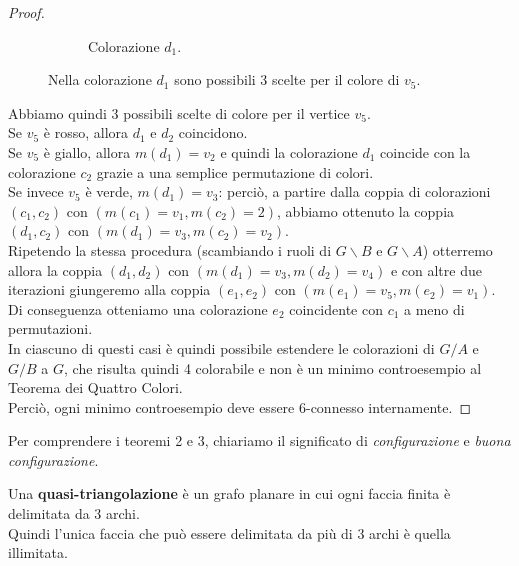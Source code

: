 \documentclass[a4paper,12pt,titlepage]{report}
\begin{document}
\begin{proof}
\begin{figure}[H]
\begin{subfigure}{0.3\textwidth}
    			\caption{Colorazione $d_1$.}
    		\end{subfigure}
    		\vspace{0.5cm}
    		\caption{Nella colorazione $d_1$ sono possibili 3 scelte per il colore di $v_5$.}
    	\end{figure}
    	\noindent Abbiamo quindi 3 possibili scelte di colore per il vertice $v_5$.
    	\\Se $v_5$ è rosso, allora $d_1$ e $d_2$ coincidono.
    	\\Se $v_5$ è giallo, allora $m(d_1) = v_2$ e quindi la colorazione $d_1$ coincide con la colorazione $c_2$ grazie a una semplice permutazione di colori.
    	\\Se invece $v_5$ è verde, $m(d_1) = v_3$: perciò, a partire dalla coppia di colorazioni $(c_1, c_2)$ con $(m(c_1) = v_1, m(c_2) = 2)$, abbiamo ottenuto la coppia $(d_1, c_2)$ con $(m(d_1) = v_3, m(c_2) = v_2)$.
    	\\Ripetendo la stessa procedura (scambiando i ruoli di $G \smallsetminus B$ e $G \smallsetminus A$) otterremo allora la coppia $(d_1, d_2)$ con $(m(d_1) = v_3, m(d_2) = v_4)$ e con altre due iterazioni giungeremo alla coppia $(e_1, e_2)$ con $(m(e_1) = v_5, m(e_2) = v_1)$.
    	\\Di conseguenza otteniamo una colorazione $e_2$ coincidente con $c_1$ a meno di permutazioni.
    	\\In ciascuno di questi casi è quindi possibile estendere le colorazioni di $G/A$ e $G/B$ a $G$, che risulta quindi 4 colorabile e non è un minimo controesempio al Teorema dei Quattro Colori.
    	\\Perciò, ogni minimo controesempio deve essere 6-connesso internamente.
    \end{proof}
    Per comprendere i teoremi 2 e 3, chiariamo il significato di \emph{configurazione} e \emph{buona configurazione}.
    \begin{dfn}
    	Una {\bfseries quasi-triangolazione} è un grafo planare in cui ogni faccia finita è delimitata da 3 archi.
    	\\Quindi l'unica faccia che può essere delimitata da più di 3 archi è quella illimitata.
    \end{dfn}
\end{document}
